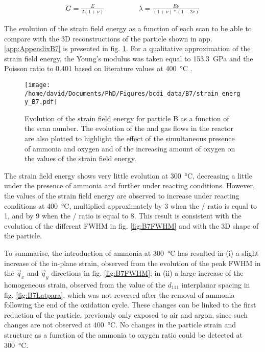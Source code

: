 \begin{align}
    G = \frac{E}{2(1+\nu)} \qquad & \qquad \lambda = \frac{E \nu}{(1+\nu)*(1-2\nu)}
    \label{eq:GandNu}
\end{align}

The evolution of the strain field energy as a function of each scan to be able to compare with the 3D reconstructions of the particle shown in app. \ref{app:AppendixB7} is presented in fig. \ref{fig:B7SFE}.
For a qualitative approximation of the strain field energy, the Young's modulus was taken equal to \qty{153.3}{\giga\pascal} and the Poisson ratio to \num{0.401} based on literature values at \qty{400}{\degreeCelsius} \parencite{Matthey2022}.

\begin{figure}[!htb]
    \centering
    \texttt{[image: /home/david/Documents/PhD/Figures/bcdi\_data/B7/strain\_energy\_B7.pdf]}
    \caption{
        Evolution of the strain field energy for particle B as a function of the scan number.
        The evolution of the  and  gas flows in the reactor are also plotted to highlight the effect of the simultaneous presence of ammonia and oxygen and of the increasing amount of oxygen on the values of the strain field energy.
    }
    \label{fig:B7SFE}
\end{figure}

The strain field energy shows very little evolution at \qty{300}{\degreeCelsius}, decreasing a little under the presence of ammonia and further under reacting conditions.
However, the values of the strain field energy are observed to increase under reacting conditions at \qty{400}{\degreeCelsius}, multiplied approximately by \num{3} when the / ratio is equal to 1, and by \num{9} when the / ratio is equal to 8.
This result is consistent with the evolution of the different FWHM in fig. \ref{fig:B7FWHM} and with the 3D shape of the particle.

To summarise, the introduction of ammonia at \qty{300}{\degreeCelsius} has resulted in (i) a slight increase of the in-plane strain, observed from the evolution of the peak FWHM in the $\vec{q}_x$ and $\vec{q}_y$ directions in fig. \ref{fig:B7FWHM}; in (ii) a large increase of the homogeneous strain, observed from the value of the $d_{111}$ interplanar spacing in fig. \ref{fig:B7Latpara}, which was not reversed after the removal of ammonia following the end of the oxidation cycle.
These changes can be linked to the first reduction of the particle, previously only exposed to air and argon, since such changes are not observed at \qty{400}{\degreeCelsius}.
No changes in the particle strain and structure as a function of the ammonia to oxygen ratio could be detected at \qty{300}{\degreeCelsius}.

